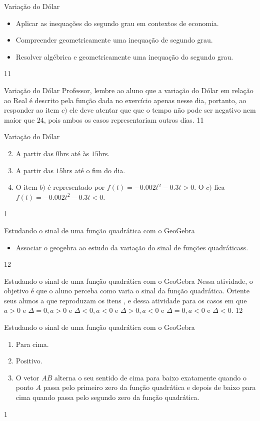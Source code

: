 \clearpage
\def\currentcolor{session1}
\begin{objectives}{Variação do Dólar}
{
\begin{itemize}
\item Aplicar as inequações do segundo grau em contextos de economia.
\item Compreender geometricamente uma inequação de segundo grau.
\item Resolver algébrica e geometricamente uma inequação do segundo grau.
\end{itemize}
}{1}{1}
\end{objectives}
\begin{sugestions}{Variação do Dólar}
{
Professor, lembre ao aluno que a variação do Dólar em relação ao Real é descrito pela função dada no exercício apenas nesse dia, portanto, ao responder ao item $c)$ ele deve atentar que que o tempo não pode ser negativo nem maior que $24$, pois ambos os casos representariam outros dias.
}{1}{1}
\end{sugestions}
\begin{answer}{Variação do Dólar}
{
\begin{enumerate}\setcounter{enumi}{1}
\item A partir das $0$hrs até às $15$hrs.
\item A partir das $15$hrs até o fim do dia.
\item O item $b)$ é representado por $f(t)=-0.002t^2-0.3t>0.$ O $c)$ fica $f(t)=-0.002t^2-0.3t<0. $
\end{enumerate}
}{1}
\end{answer}
\clearmargin
\begin{objectives}{Estudando o sinal de uma função quadrática com o GeoGebra}
{
\begin{itemize}
\item Associar o geogebra ao estudo da variação do sinal de funções quadráticass.
\end{itemize}
}{1}{2}
\end{objectives}
\begin{sugestions}{Estudando o sinal de uma função quadrática com o GeoGebra}
{
Nessa atividade, o objetivo é que o aluno perceba como varia o sinal da função quadrática.
Oriente seus alunos a que reproduzam os itens ,  e  dessa atividade para os casos em que $a>0$ e $\Delta =0, a>0$ e $\Delta <0, a<0$ e $\Delta>0, a<0$ e $\Delta=0, a<0$ e $\Delta<0$.
}{1}{2}
\end{sugestions}
\clearmargin
\begin{answer}{Estudando o sinal de uma função quadrática com o GeoGebra}
{
\begin{enumerate}
\item Para cima.
\item Positivo.
\item O vetor $AB$ alterna o seu sentido de cima para baixo exatamente quando o ponto $A$ passa pelo primeiro zero da função quadrática e depois de baixo para cima quando passa pelo segundo zero da função quadrática.
\end{enumerate}
}{1}
\end{answer}

